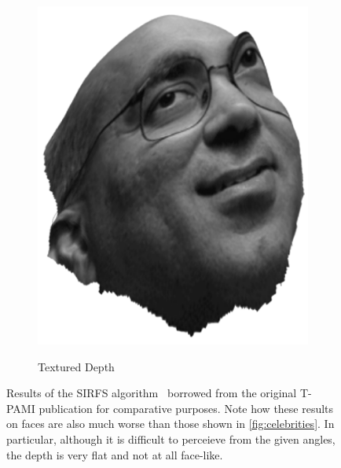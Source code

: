 \begin{figure}
\begin{subfigure}{0.23\textwidth}
        \includegraphics[width=\textwidth]{statistical_normals/images/sirfs_borrowed/sirfs_depth2}
\label{subfig:sirfs-2-depth}
        \caption*{Textured Depth}
    \end{subfigure}
    \caption{Results of the SIRFS algorithm~\cite{barron2015shape} borrowed
             from the original T-PAMI publication for comparative purposes. Note
             how these results on faces are also much worse than those shown in
             \cref{fig:celebrities}. In particular, although it is difficult to
             perceieve from the given angles, the depth is very flat and not at
             all face-like.}
\label{fig:sfs-sirfs-orig-results}
\end{figure}

